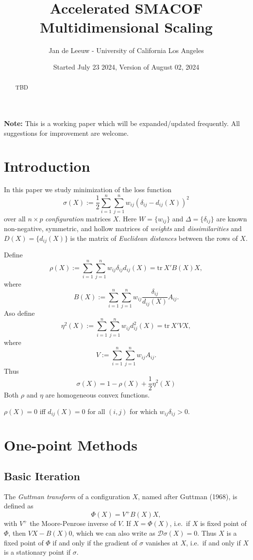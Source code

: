 \documentclass[
  12pt,
]{article}
\title{Accelerated SMACOF Multidimensional Scaling}
\author{Jan de Leeuw - University of California Los Angeles}
\date{Started July 23 2024, Version of August 02, 2024}
\begin{document}
\maketitle
\begin{abstract}
TBD
\end{abstract}

{
\setcounter{tocdepth}{3}
\tableofcontents
}
\textbf{Note:} This is a working paper which will be expanded/updated frequently. All suggestions for improvement are welcome.

\section{Introduction}\label{introduction}

In this paper we study minimization of the loss function
\[
\sigma(X):=\frac12\sum_{i=1}^n\sum_{j=1}^n w_{ij}(\delta_{ij}-d_{ij}(X))^2
\]
over all \(n\times p\) \emph{configuration} matrices \(X\). Here \(W=\{w_{ij}\}\) and \(\Delta=\{\delta_{ij}\}\) are known non-negative, symmetric, and hollow matrices of \emph{weights} and \emph{dissimilarities} and \(D(X)=\{d_{ij}(X)\}\) is the matrix of \emph{Euclidean distances} between the rows of \(X\).

Define
\[
\rho(X):=\sum_{i=1}^n\sum_{j=1}^n w_{ij}\delta_{ij}d_{ij}(X)=\text{tr}\ X'B(X)X,
\]
where
\[
B(X):=\sum_{i=1}^n\sum_{j=1}^nw_{ij}\frac{\delta_{ij}}{d_{ij}(X)}A_{ij}.
\]
Aso define
\[
\eta^2(X):=\sum_{i=1}^n\sum_{j=1}^nw_{ij}d_{ij}^2(X)=\text{tr}\ X'VX,
\]
where
\[
V:=\sum_{i=1}^n\sum_{j=1}^n w_{ij}A_{ij}.
\]
Thus
\[
\sigma(X)=1-\rho(X)+\frac12\eta^2(X)
\]
Both \(\rho\) and \(\eta\) are homogeneous convex functions.

\(\rho(X)=0\) iff \(d_{ij}(X)=0\) for all \((i,j)\) for which \(w_{ij}\delta_{ij}>0\).

\section{One-point Methods}\label{one-point-methods}

\subsection{Basic Iteration}\label{basic-iteration}

The \emph{Guttman transform} of a configuration \(X\), named after Guttman (1968), is defined as
\[
\Phi(X)=V^+B(X)X,
\]
with \(V^+\) the Moore-Penrose inverse of \(V\). If \(X=\Phi(X)\), i.e.~if \(X\) is
fixed point of \(\Phi\), then \(VX-B(X)0\), which we can also write as
\(\mathcal{D}\sigma(X)=0\). Thus \(X\) is a fixed point of \(\Phi\) if and only
if the gradient of \(\sigma\) vanishes at \(X\), i.e.~if and only if \(X\) is a
stationary point if \(\sigma\).
\end{document}
